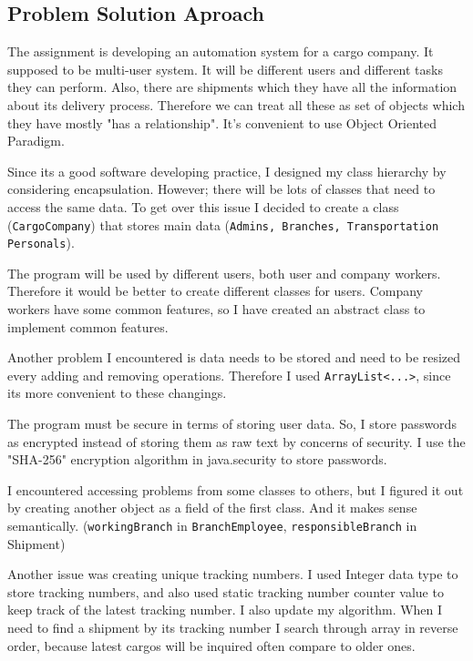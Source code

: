 \documentclass[a4paper]{article}
\begin{document}
\begin{Large}
\newpage

\section{Problem Solution Aproach}
The assignment is developing an automation system for a cargo company.
It supposed to be multi-user system. It will be different users and different
tasks they can perform. Also, there are shipments which they have all the
information about its delivery process. Therefore we can treat all these as
set of objects which they have mostly "has a relationship". It's convenient
to use Object Oriented Paradigm.

Since its a good software developing practice, I designed my class
hierarchy by considering encapsulation. However; there will be lots of
classes that need to access the same data. To get over this issue I decided
to create a class (\texttt {CargoCompany}) that stores main data (\texttt {Admins,
Branches, Transportation Personals}).

The program will be used by different users, both user and company
workers. Therefore it would be better to create different classes for users.
Company workers have some common features, so I have created an
abstract class to implement common features.

Another problem I encountered is data needs to be stored and need to be
resized every adding and removing operations. Therefore I used \texttt {ArrayList<...>}, 
since its more convenient to these changings.

The program must be secure in terms of storing user data. So, I store
passwords as encrypted instead of storing them as raw text by concerns of
security. I use the "SHA-256" encryption algorithm in java.security to store
passwords.

I encountered accessing problems from some classes to others, but I
figured it out by creating another object as a field of the first class. And it
makes sense semantically. (\texttt {workingBranch} in \texttt {BranchEmployee},
\texttt {responsibleBranch} in Shipment)

Another issue was creating unique tracking numbers. I used Integer data
type to store tracking numbers, and also used static tracking number
counter value to keep track of the latest tracking number. I also update my
algorithm. When I need to find a shipment by its tracking number I search
through array in reverse order, because latest cargos will be inquired often
compare to older ones.


\end{Large}
\end{document}
